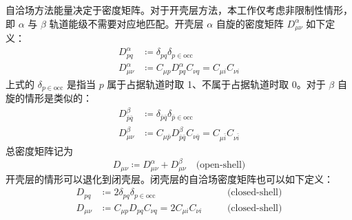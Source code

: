 自洽场方法能量决定于密度矩阵。对于开壳层方法，本工作仅考虑非限制性情形，即 $\alpha$ 与 $\beta$ 轨道能级不需要对应地匹配。开壳层 $\alpha$ 自旋的密度矩阵 $D_{\mu \nu}^\alpha$ 如下定义：
\begin{subequations}
\begin{align}
    D_{pq}^\alpha &\coloneq \delta_{pq} \delta_{p \in \mathrm{occ}} \\
    D_{\mu \nu}^\alpha &\coloneq C_{\mu p} D_{pq}^\alpha C_{\nu q} = C_{\mu i} C_{\nu i}
\end{align}
\end{subequations}
上式的 $\delta_{p \in \mathrm{occ}}$ 是指当 $p$ 属于占据轨道时取 1、不属于占据轨道时取 0。对于 $\beta$ 自旋的情形是类似的：
\begin{subequations}
\begin{align}
    D_{\bar p \bar q}^\beta &\coloneq \delta_{\bar p \bar q} \delta_{\bar p \in \mathrm{occ}} \\
    D_{\mu \nu}^\beta &\coloneq C_{\mu \bar p} D_{\bar p \bar q}^\beta C_{\nu \bar q} = C_{\mu \bar i} C_{\nu \bar i}
\end{align}
\end{subequations}
总密度矩阵记为
\begin{equation}
    D_{\mu \nu} \coloneq D_{\mu \nu}^\alpha + D_{\mu \nu}^\beta \quad \text{(open-shell)}
\end{equation}
开壳层的情形可以退化到闭壳层。闭壳层的自洽场密度矩阵也可以如下定义：
\begin{subequations}
\begin{alignat}{10}
    \label{eq.3.def.dm-scf-closed-1}
    D_{pq} &\coloneq 2 \delta_{pq} \delta_{p \in \mathrm{occ}} \quad &&\text{(closed-shell)} \\
    \label{eq.3.def.dm-scf-closed-2}
    D_{\mu \nu} &\coloneq C_{\mu p} D_{pq} C_{\nu q} = 2 C_{\mu i} C_{\nu i} \quad &&\text{(closed-shell)}
\end{alignat}
\end{subequations}

